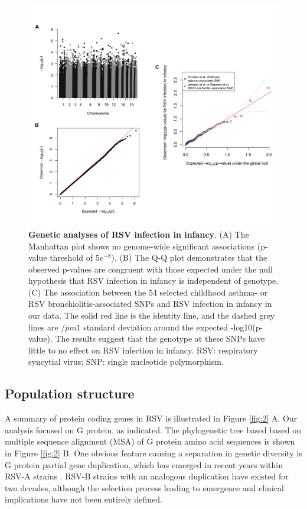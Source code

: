 \documentclass{article} %
\begin{document}
\begin{figure}[ht] \hspace{-0.5cm}
\begin{center}
    \includegraphics[scale=0.07]{host_genetics}
\end{center} 
	\caption{\textbf{Genetic analyses of RSV infection in infancy}.
		(A) The Manhattan plot shows no genome-wide significant associations (p-value threshold of $5e^{-8}$).
		(B) The Q-Q plot demonstrates that the observed p-values are congruent with those expected under the null hypothesis that RSV infection in infancy is independent of genotype. 
		(C) The association between the 54 selected childhood asthma- or RSV bronchiolitis-associated SNPs and RSV infection in infancy in our data. 
		The solid red line is the identity line, and the dashed grey lines are $/pm 1$ standard deviation around the expected -log10(p-value). 
		The results suggest that the genotype at these SNPs have little to no effect on RSV infection in infancy. 
		RSV: respiratory syncytial virus; SNP: single nucleotide polymorphism.
	}
	\label{fig:host_genetics} 
\end{figure}
\clearpage

\subsection{Population structure}
A summary of protein coding genes in RSV is illustrated in
Figure \ref{fig:2} A.
Our analysis focused on G protein, as indicated.
The phylogenetic tree based based on multiple sequence alignment (MSA) of G protein amino acid sequences is shown in 
Figure \ref{fig:2} B.
One obvious feature causing a separation in genetic diversity is G protein partial gene duplication, 
which has emerged in recent years within RSV-A strains 
\citep{eshaghi2012genetic}.
RSV-B strains with an analogous duplication have existed for two decades, 
although the selection process leading to emergence and clinical implications have not been entirely defined.
\end{document}
